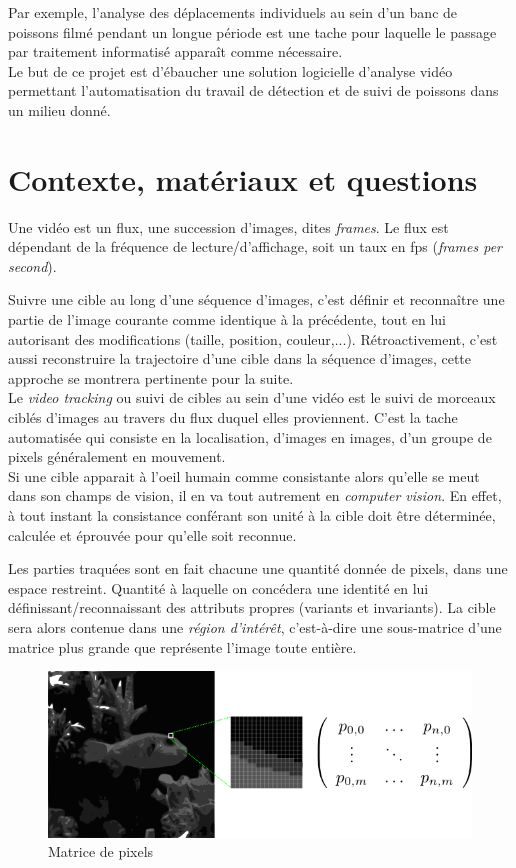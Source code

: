 \documentclass[a4paper,12pt]{report}
\begin{document}
Par exemple, l'analyse des déplacements individuels au sein d'un banc de poissons filmé pendant un longue période est une tache pour laquelle le passage par traitement informatisé apparaît comme nécessaire.\\

Le but de ce projet est d'ébaucher une solution logicielle d'analyse vidéo permettant l'automatisation du travail de détection et de suivi de poissons dans un milieu donné. 

\section{Contexte, matériaux et questions}
Une vidéo est un flux, une succession d'images, dites  \textit{frames}. Le flux est dépendant de la fréquence de lecture/d'affichage, soit un taux en fps (\textit{frames per second}). 

Suivre une cible au long d'une séquence d'images, c'est définir et reconnaître une partie de l'image courante comme identique à la précédente, tout en lui autorisant des modifications (taille, position, couleur,...). Rétroactivement, c'est aussi reconstruire la trajectoire d'une cible dans la séquence d'images, cette approche se montrera pertinente pour la suite.\\

Le \textit{video tracking} ou suivi de cibles au sein d'une vidéo est le suivi de morceaux ciblés d'images au travers du flux duquel elles proviennent. C'est la tache automatisée qui consiste en la localisation, d'images en images, d'un groupe de pixels généralement en mouvement. \\

Si une cible apparait à l'oeil humain comme consistante alors qu'elle se meut dans son champs de vision, il en va tout autrement en \textit{computer vision}. En effet, à tout instant la consistance conférant son unité à la cible doit être déterminée, calculée et éprouvée pour qu'elle soit reconnue. 

Les parties traquées sont en fait chacune une quantité donnée de pixels, dans une espace restreint. Quantité à laquelle on concédera une identité en lui définissant/reconnaissant des attributs propres (variants et invariants). La cible sera alors contenue dans une \textit{région d'intérêt}, c'est-à-dire une sous-matrice d'une matrice plus grande que représente l'image toute entière.\\

\begin{figure}[hbtp]
\centering
\includegraphics[scale=1]{figureImageMatrice.png}
\caption{Matrice de pixels}
\end{figure}
\end{document}
